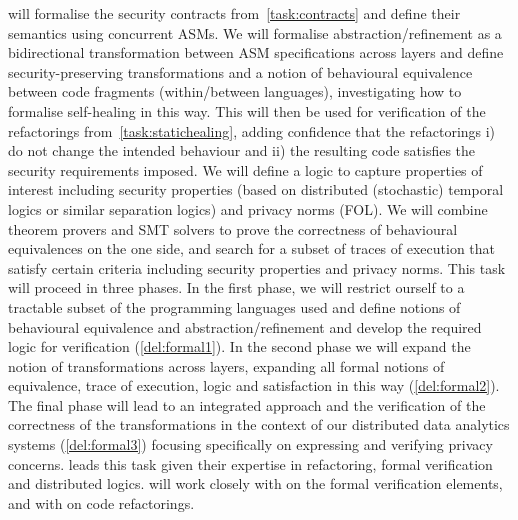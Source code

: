 \begin{Workpackage}{\thewpno}
\begin{Task}
\theTask{} will formalise the security contracts from~\ref{task:contracts} and define their semantics using concurrent ASMs. We will formalise abstraction/refinement as a bidirectional transformation between ASM specifications across layers and define security-preserving transformations and a notion of behavioural equivalence between code fragments (within/between languages), investigating how to formalise self-healing in this way. This will then be used for verification of the refactorings from~\ref{task:statichealing}, adding confidence that the refactorings i) do not change the intended behaviour and ii) the resulting code satisfies the security requirements imposed. 
We will define a logic to capture properties of interest  including security properties (based on distributed (stochastic) temporal logics or similar separation
logics) and privacy norms (FOL). 
We will combine theorem provers and SMT solvers to prove the correctness of behavioural equivalences on the one side, and search for a subset of traces of execution that satisfy certain criteria including security properties and privacy norms.
This task will proceed in three phases. In the first phase, we will restrict ourself to a tractable subset of the programming languages used and define notions of behavioural equivalence and abstraction/refinement and develop the required logic for verification (\ref{del:formal1}). In the second phase we will expand the notion of transformations across layers, expanding all formal notions of equivalence, trace of execution, logic and satisfaction in this way  (\ref{del:formal2}). The final phase will lead to an integrated approach and the verification of the correctness of the transformations in the context of our distributed data analytics systems (\ref{del:formal3}) focusing specifically on expressing and verifying privacy concerns.
\SA leads this task given their expertise in refactoring, formal verification and distributed logics. \SA will work closely with \SCCHshort on the formal verification elements, and with \UCM on code refactorings.

\end{Task}


\end{Workpackage}
